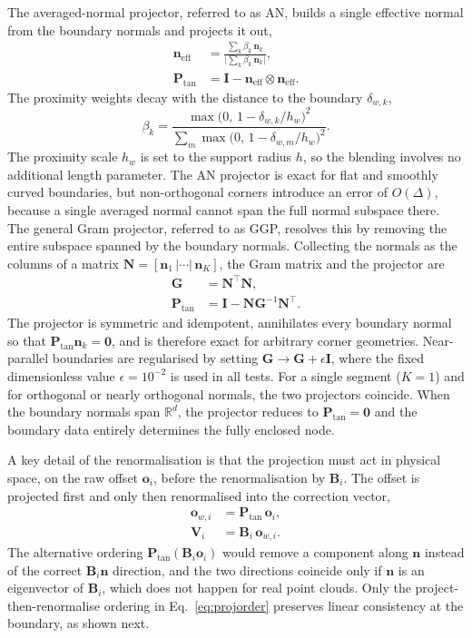 \documentclass[preprint,review,12pt]{elsarticle}
\newcommand{\Bi}{\mathbf{B}_i}
\newcommand{\oi}{\mathbf{o}_i}
\newcommand{\ow}{\mathbf{o}_{w,i}}
\newcommand{\Vi}{\mathbf{V}_i}
\newcommand{\Ptan}{\mathbf{P}_{\mathrm{tan}}}
\begin{document}
The averaged-normal projector, referred to as AN, builds a single effective normal from the boundary normals and projects it out,
\begin{align}
  \mathbf n_{\mathrm{eff}} &= \frac{\sum_k\beta_k\,\mathbf n_k}{\big|\sum_k\beta_k\,\mathbf n_k\big|}, \label{eq:neff}\\
  \Ptan &= \mathbf I-\mathbf n_{\mathrm{eff}}\otimes\mathbf n_{\mathrm{eff}}. \label{eq:AN}
\end{align}
The proximity weights decay with the distance to the boundary $\delta_{w,k}$,
\begin{equation}
  \beta_k=\frac{\max\!\big(0,\,1-\delta_{w,k}/h_w\big)^2}{\sum_m\max\!\big(0,\,1-\delta_{w,m}/h_w\big)^2}.
  \label{eq:beta}
\end{equation}
The proximity scale $h_w$ is set to the support radius $h$, so the blending involves no additional length parameter.
The AN projector is exact for flat and smoothly curved boundaries, but non-orthogonal corners introduce an error of $O(\Delta)$, because a single averaged normal cannot span the full normal subspace there.
The general Gram projector, referred to as GGP, resolves this by removing the entire subspace spanned by the boundary normals.
Collecting the normals as the columns of a matrix $\mathbf N=[\mathbf n_1\,|\cdots|\,\mathbf n_K]$, the Gram matrix and the projector are
\begin{align}
  \mathbf G &= \mathbf N^\top\mathbf N, \label{eq:gram}\\
  \Ptan &= \mathbf I-\mathbf N\mathbf G^{-1}\mathbf N^\top. \label{eq:GGP}
\end{align}
The projector is symmetric and idempotent, annihilates every boundary normal so that $\Ptan\mathbf n_k=\mathbf 0$, and is therefore exact for arbitrary corner geometries.
Near-parallel boundaries are regularised by setting $\mathbf G\to\mathbf G+\epsilon\mathbf I$, where the fixed dimensionless value $\epsilon=10^{-2}$ is used in all tests.
For a single segment ($K=1$) and for orthogonal or nearly orthogonal normals, the two projectors coincide.
When the boundary normals span $\mathbb{R}^d$, the projector reduces to $\Ptan=\mathbf 0$ and the boundary data entirely determines the fully enclosed node.

A key detail of the renormalisation is that the projection must act in physical space, on the raw offset $\oi$, before the renormalisation by $\Bi$.
The offset is projected first and only then renormalised into the correction vector,
\begin{align}
  \ow &= \Ptan\,\oi, \label{eq:ow}\\
  \Vi &= \Bi\,\ow. \label{eq:projorder}
\end{align}
The alternative ordering $\Ptan(\Bi\oi)$ would remove a component along $\mathbf n$ instead of the correct $\Bi\mathbf n$ direction, and the two directions coincide only if $\mathbf n$ is an eigenvector of $\Bi$, which does not happen for real point clouds.
Only the project-then-renormalise ordering in Eq.~\eqref{eq:projorder} preserves linear consistency at the boundary, as shown next.
\end{document}
